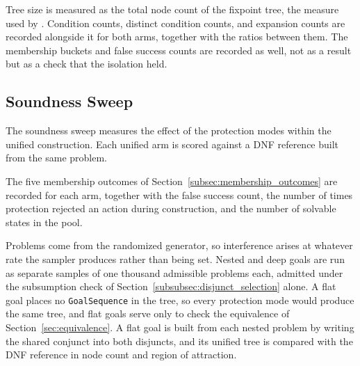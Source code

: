     Tree size is measured as the total node count of the fixpoint tree, the measure used by \cite{cai2021}.
    Condition counts, distinct condition counts, and expansion counts are recorded alongside it for both arms, together with the ratios between them.
    The membership buckets and false success counts are recorded as well, not as a result but as a check that the isolation held.

    \subsection{Soundness Sweep}
    \label{subsec:soundness_sweep}
    The soundness sweep measures the effect of the protection modes within the unified construction.
    Each unified arm is scored against a DNF reference built from the same problem.

    The five membership outcomes of Section~\ref{subsec:membership_outcomes} are recorded for each arm, together with the false success count, the number of times protection rejected an action during construction, and the number of solvable states in the pool.

    Problems come from the randomized generator, so interference arises at whatever rate the sampler produces rather than being set.
    Nested and deep goals are run as separate samples of one thousand admissible problems each, admitted under the subsumption check of Section~\ref{subsubsec:disjunct_selection} alone.
    A flat goal places no \texttt{GoalSequence} in the tree, so every protection mode would produce the same tree, and flat goals serve only to check the equivalence of Section~\ref{sec:equivalence}.
    A flat goal is built from each nested problem by writing the shared conjunct into both disjuncts, and its unified tree is compared with the DNF reference in node count and region of attraction.

